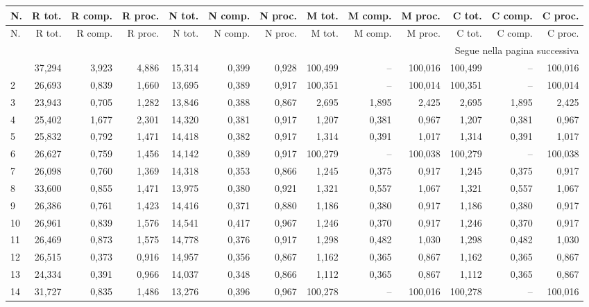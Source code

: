 \begin{longtable}{lrrrrrrrrrrrr}
\toprule
N. & R tot. & R comp. & R proc. & N tot. & N comp. & N proc. & M tot. & M comp. & M proc. & C tot. & C comp. & C proc. \\
\midrule
\endfirsthead
\toprule
N. & R tot. & R comp. & R proc. & N tot. & N comp. & N proc. & M tot. & M comp. & M proc. & C tot. & C comp. & C proc. \\
\midrule\endhead
\midrule\multicolumn{13}{r}{\footnotesize Segue nella pagina successiva}\\
\endfoot
\bottomrule\endlastfoot
1 & 37,294 & 3,923 & 4,886 & 15,314 & 0,399 & 0,928 & 100,499 & -- & 100,016 & 100,499 & -- & 100,016 \\
2 & 26,693 & 0,839 & 1,660 & 13,695 & 0,389 & 0,917 & 100,351 & -- & 100,014 & 100,351 & -- & 100,014 \\
3 & 23,943 & 0,705 & 1,282 & 13,846 & 0,388 & 0,867 & 2,695 & 1,895 & 2,425 & 2,695 & 1,895 & 2,425 \\
4 & 25,402 & 1,677 & 2,301 & 14,320 & 0,381 & 0,917 & 1,207 & 0,381 & 0,967 & 1,207 & 0,381 & 0,967 \\
5 & 25,832 & 0,792 & 1,471 & 14,418 & 0,382 & 0,917 & 1,314 & 0,391 & 1,017 & 1,314 & 0,391 & 1,017 \\
6 & 26,627 & 0,759 & 1,456 & 14,142 & 0,389 & 0,917 & 100,279 & -- & 100,038 & 100,279 & -- & 100,038 \\
7 & 26,098 & 0,760 & 1,369 & 14,318 & 0,353 & 0,866 & 1,245 & 0,375 & 0,917 & 1,245 & 0,375 & 0,917 \\
8 & 33,600 & 0,855 & 1,471 & 13,975 & 0,380 & 0,921 & 1,321 & 0,557 & 1,067 & 1,321 & 0,557 & 1,067 \\
9 & 26,386 & 0,761 & 1,423 & 14,416 & 0,371 & 0,880 & 1,186 & 0,380 & 0,917 & 1,186 & 0,380 & 0,917 \\
10 & 26,961 & 0,839 & 1,576 & 14,541 & 0,417 & 0,967 & 1,246 & 0,370 & 0,917 & 1,246 & 0,370 & 0,917 \\
11 & 26,469 & 0,873 & 1,575 & 14,778 & 0,376 & 0,917 & 1,298 & 0,482 & 1,030 & 1,298 & 0,482 & 1,030 \\
12 & 26,515 & 0,373 & 0,916 & 14,957 & 0,356 & 0,867 & 1,162 & 0,365 & 0,867 & 1,162 & 0,365 & 0,867 \\
13 & 24,334 & 0,391 & 0,966 & 14,037 & 0,348 & 0,866 & 1,112 & 0,365 & 0,867 & 1,112 & 0,365 & 0,867 \\
14 & 31,727 & 0,835 & 1,486 & 13,276 & 0,396 & 0,967 & 100,278 & -- & 100,016 & 100,278 & -- & 100,016 \\

\end{longtable}
